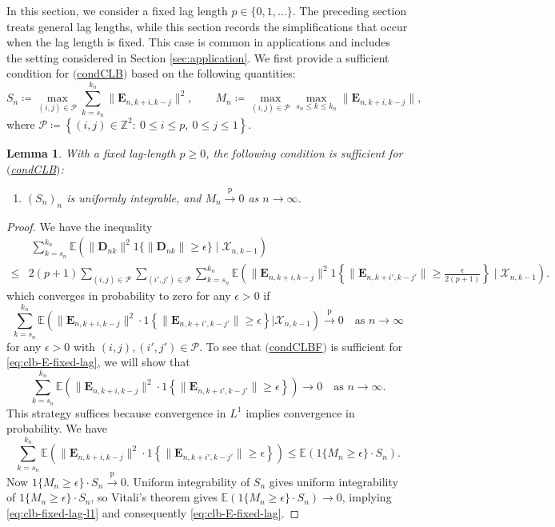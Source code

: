 \documentclass[11pt]{article}
\renewcommand\vec[1]{\boldsymbol{#1}}
\newcommand{\E}{\mathbb{E}}
\newcommand{\X}{\mathcal{X}}
\newcommand{\Z}{\mathbb{Z}}
\newcommand{\PP}{\mathcal{P}}
\newcommand{\labeleditem}[1]{%
  \item[$\mathrm{(}$\csname cond#1\endcsname$\mathrm{)}$]%
  \hypertarget{cond:#1}{}%
}
\newcommand{\refitem}[1]{$\mathrm{(}$\hyperlink{cond:#1}{\csname cond#1\endcsname}$\mathrm{)}$}
\newcommand{\pconverge}{\overset{\mathrm{p}}{\to}}
\newtheorem{lemma}{Lemma}
\theoremstyle{definition}
\begin{document}
In this section, we consider a fixed lag length $p \in \{0, 1, \ldots\}$.
The preceding section treats general lag lengths, while this section records the simplifications that occur when the lag length is fixed.
This case is common in applications and includes the setting considered in Section \ref{sec:application}.
We first provide a sufficient condition for \refitem{CLB} based on the following quantities:
\[
    S_n \coloneqq \max_{(i, j) \in \PP} \sum_{k=s_n}^{k_n} \| \vec{E}_{n,k+i,k-j} \|^2, \qquad
    M_n \coloneqq \max_{(i, j) \in \PP} \max_{s_n \leq k \leq k_n} \| \vec{E}_{n,k+i,k-j} \|,
\]
where $\PP \coloneqq \left\{(i, j) \in \Z^2:\ 0 \leq i \leq p,\ 0 \leq j \leq 1\right\}$.
\begin{lemma}\label{lemma:clb-fixed}
With a fixed lag-length $p \geq 0$, the following condition is sufficient for \refitem{CLB}:
\begin{enumerate}
    \labeleditem{CLBF} $(S_n)_n$ is uniformly integrable, and $M_n \pconverge 0$ as $n \to \infty$.
\end{enumerate}
\end{lemma}

\begin{proof}
We have the inequality
\begin{align*}
&\ \sum_{k=s_n}^{k_n}
\E\left(
\|\vec D_{nk}\|^2
1\{\|\vec D_{nk}\|\geq\epsilon\}
\mid\X_{n,k-1}
\right)\\
\leq{}&
2(p+1)
\sum_{(i,j)\in\PP}
\sum_{(i',j')\in\PP}
\sum_{k=s_n}^{k_n}
\E\left(
\|\vec E_{n,k+i,k-j}\|^2
1\left\{
\|\vec E_{n,k+i',k-j'}\|
\geq\frac{\epsilon}{2(p+1)}
\right\}
\mid\X_{n,k-1}
\right).
\end{align*}
which converges in probability to zero for any $\epsilon > 0$ if
\begin{equation}\label{eq:clb-E-fixed-lag}
\sum_{k=s_n}^{k_n} \E \left(\big\| \vec{E}_{n,k+i,k-j}\big\|^2 \cdot 1\left\{\big\|  \vec{E}_{n,k+i',k-j'} \big\| \geq \epsilon \right\} \Big| \X_{n,k-1} \right) \pconverge 0 \quad \text{as } n \to \infty
\end{equation}
for any $\epsilon > 0$ with $(i, j), (i', j') \in \PP$.
To see that \refitem{CLBF} is sufficient for \eqref{eq:clb-E-fixed-lag}, we will show that 
\begin{equation}\label{eq:clb-fixed-lag-l1}
\sum_{k=s_n}^{k_n} \E \left(\big\| \vec{E}_{n,k+i,k-j}\big\|^2 \cdot 1\left\{\big\|  \vec{E}_{n,k+i',k-j'} \big\| \geq \epsilon \right\}\right) \to 0 \quad \text{as } n \to \infty.
\end{equation}
This strategy suffices because convergence in $L^1$ implies convergence in probability.
We have
\[
\sum_{k=s_n}^{k_n} \E \left(\big\| \vec{E}_{n,k+i,k-j}\big\|^2 \cdot 1\left\{\big\|  \vec{E}_{n,k+i',k-j'} \big\| \geq \epsilon \right\}\right)
\leq \E\left( 1\{M_n \geq \epsilon\} \cdot S_n \right).
\]
Now $1\{M_n \geq \epsilon\} \cdot S_n \pconverge 0$.
Uniform integrability of \(S_n\) gives uniform integrability of \(1\{M_n \geq \epsilon\} \cdot S_n\), so Vitali's theorem gives $\E\left( 1\{M_n \geq \epsilon\} \cdot S_n \right) \to 0$, implying \eqref{eq:clb-fixed-lag-l1} and consequently \eqref{eq:clb-E-fixed-lag}.
\end{proof}
\end{document}
